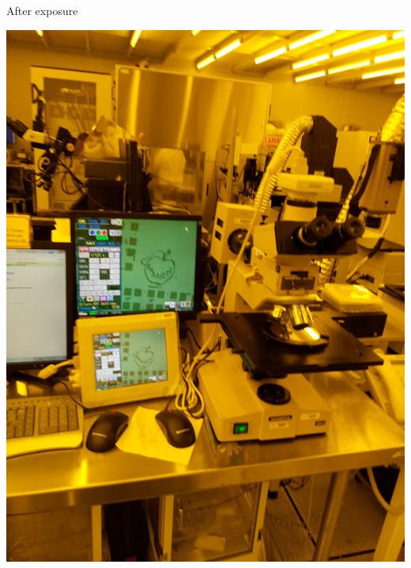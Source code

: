 \documentclass[aspectratio=169]{beamer}
\begin{document}
\begin{frame}{After exposure}
\begin{center}
		\includegraphics[height=0.8\textheight]{images/20181210_125845.jpg}
	\end{center}
\end{frame}
\end{document}
